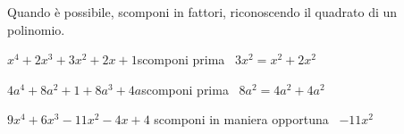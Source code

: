 \begin{esercizio}
\label{ese:16.18}
Quando è possibile, scomponi in fattori, riconoscendo il quadrato di un polinomio.
\begin{enumeratea}
 \item \(x^{4}+2x^{3}+3x^{2}+2x+1\)\quad  scomponi prima \quad~\(3x^{2}=x^{2}+2x^{2}\)
 \item \(4a^{4}+8a^{2}+1+8a^{3}+4a\)\quad  scomponi prima \quad~\(8a^{2}=4a^{2}+4a^{2}\)
 \item \(9x^{4}+6x^{3}-11x^{2}-4x+4\) \quad scomponi in maniera opportuna \quad~\(-11x^{2}\)
\end{enumeratea}
\end{esercizio}


\paragraph*{}

